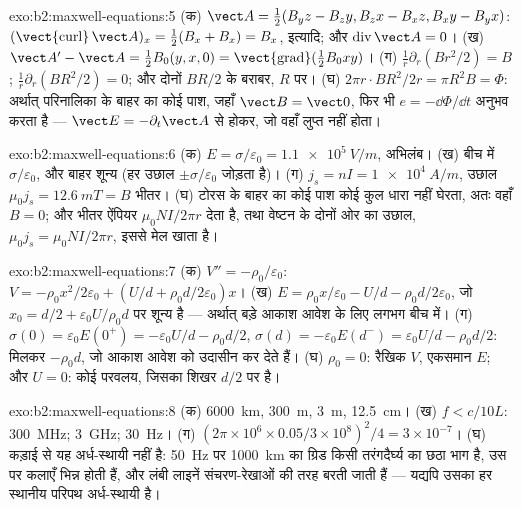 \begin{solution}{exo:b2:maxwell-equations:5}
(क) $\vect A = \tfrac12(B_yz - B_zy, B_zx - B_xz, B_xy - B_yx)$: $(\operatorname{\vect{curl}}
\vect A)_x = \tfrac12(B_x + B_x) = B_x$, इत्यादि; और $\operatorname{div}\vect A = 0$। (ख)
$\vect A' - \vect A = \tfrac12B_0(y, x, 0) = \operatorname{\vect{grad}}(\tfrac12B_0xy)$। (ग)
$\frac1r\partial_r(Br^2/2) = B$; $\frac1r\partial_r(BR^2/2) = 0$; और दोनों $BR/2$ के
बराबर, $R$ पर। (घ) $2\pi r\cdot BR^2/2r = \pi R^2B = \Phi$: अर्थात् परिनालिका के बाहर का कोई पाश,
जहाँ $\vect B = \vect 0$, फिर भी $e = -\dd\Phi/\dd t$ अनुभव करता है --- $\vect E =
-\partial_t\vect A$ से होकर, जो वहाँ लुप्त नहीं होता।
\end{solution}

\begin{solution}{exo:b2:maxwell-equations:6}
(क) $E = \sigma/\varepsilon_0 = \qty{1.1e5}{V/m}$, अभिलंब। (ख) बीच में $\sigma/\varepsilon_0$, और बाहर
शून्य (हर उछाल $\pm\sigma/\varepsilon_0$ जोड़ता है)। (ग) $j_s = nI = \qty{1e4}{A/m}$, उछाल
$\mu_0j_s = \qty{12.6}{mT} = B$ भीतर। (घ) टोरस के बाहर का कोई पाश कोई कुल धारा
नहीं घेरता, अतः वहाँ $B = 0$; और भीतर ऐंपियर $\mu_0NI/2\pi r$ देता है,
तथा वेष्टन के दोनों ओर का उछाल, $\mu_0j_s = \mu_0NI/2\pi r$, इससे मेल खाता है।
\end{solution}

\begin{solution}{exo:b2:maxwell-equations:7}
(क) $V'' = -\rho_0/\varepsilon_0$: $V = -\rho_0x^2/2\varepsilon_0 + (U/d + \rho_0d/2\varepsilon_0)x$। (ख)
$E = \rho_0x/\varepsilon_0 - U/d - \rho_0d/2\varepsilon_0$, जो $x_0 = d/2 + \varepsilon_0U/\rho_0d$ पर शून्य है
--- अर्थात् बड़े आकाश आवेश के लिए लगभग बीच में। (ग) $\sigma(0) = \varepsilon_0E(0^+) =
-\varepsilon_0U/d - \rho_0d/2$, $\sigma(d) = -\varepsilon_0E(d^-) = \varepsilon_0U/d - \rho_0d/2$: मिलकर
$-\rho_0d$, जो आकाश आवेश को उदासीन कर देते हैं। (घ) $\rho_0 = 0$: रैखिक $V$, एकसमान
$E$; और $U = 0$: कोई परवलय, जिसका शिखर $d/2$ पर है।
\end{solution}

\begin{solution}{exo:b2:maxwell-equations:8}
(क) \qty{6000}{km}, \qty{300}{m}, \qty{3}{m}, \qty{12.5}{cm}। (ख) $f < c/10L$:
\qty{300}{MHz}; \qty{3}{GHz}; \qty{30}{Hz}। (ग) $(2\pi \times 10^6 \times 0.05/3 \times 10^8)^2/4 =
3 \times 10^{-7}$। (घ) कड़ाई से यह अर्ध-स्थायी नहीं है: \qty{50}{Hz} पर \qty{1000}{km} का ग्रिड
किसी तरंगदैर्घ्य का छठा भाग है, उस पर कलाएँ भिन्न होती हैं, और लंबी लाइनें
संचरण-रेखाओं की तरह बरती जाती हैं --- यद्यपि उसका हर स्थानीय परिपथ
अर्ध-स्थायी है।
\end{solution}

